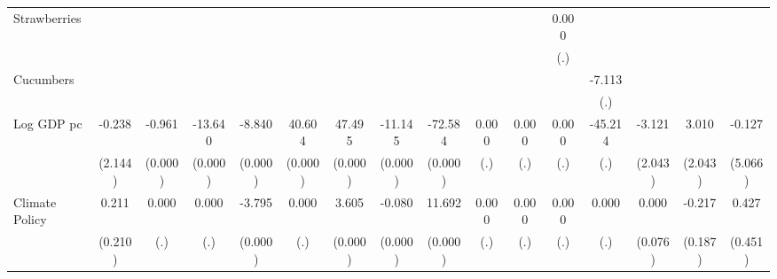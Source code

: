 \begin{table}[htbp]
\begin{tabular}{l*{15}{c}}
Strawberries&                  &                  &                  &                  &                  &                  &                  &                  &                  &                  &    0.000         &                  &                  &                  &                  \\
          &                  &                  &                  &                  &                  &                  &                  &                  &                  &                  &      (.)         &                  &                  &                  &                  \\
Cucumbers &                  &                  &                  &                  &                  &                  &                  &                  &                  &                  &                  &   -7.113         &                  &                  &                  \\
          &                  &                  &                  &                  &                  &                  &                  &                  &                  &                  &                  &      (.)         &                  &                  &                  \\
Log GDP pc&   -0.238         &   -0.961\sym{***}&  -13.640\sym{***}&   -8.840\sym{***}&   40.604\sym{***}&   47.495\sym{***}&  -11.145\sym{***}&  -72.584\sym{***}&    0.000         &    0.000         &    0.000         &  -45.214         &   -3.121         &    3.010         &   -0.127         \\
          &  (2.144)         &  (0.000)         &  (0.000)         &  (0.000)         &  (0.000)         &  (0.000)         &  (0.000)         &  (0.000)         &      (.)         &      (.)         &      (.)         &      (.)         &  (2.043)         &  (2.043)         &  (5.066)         \\
Climate Policy&    0.211         &    0.000         &    0.000         &   -3.795\sym{***}&    0.000         &    3.605\sym{***}&   -0.080\sym{***}&   11.692\sym{***}&    0.000         &    0.000         &    0.000         &    0.000         &    0.000         &   -0.217         &    0.427         \\
          &  (0.210)         &      (.)         &      (.)         &  (0.000)         &      (.)         &  (0.000)         &  (0.000)         &  (0.000)         &      (.)         &      (.)         &      (.)         &      (.)         &  (0.076)         &  (0.187)         &  (0.451)         \\

\end{tabular}
\end{table}
